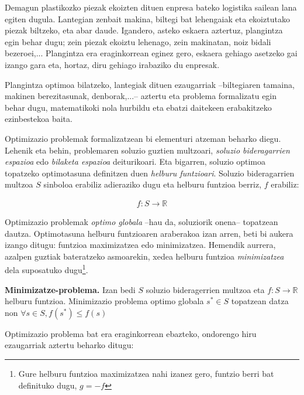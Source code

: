 \documentclass[eu]{ifirak}\usepackage[]{graphicx}\usepackage[]{color}
\begin{document}
\begin{tcolorbox}
\begin{ifexample}
Demagun plastikozko piezak ekoizten dituen enpresa bateko logistika sailean lana egiten dugula. Lantegian zenbait makina, biltegi bat lehengaiak eta ekoiztutako piezak biltzeko, eta abar daude. Igandero, asteko eskaera aztertuz, plangintza egin behar dugu; zein piezak ekoiztu lehenago, zein makinatan, noiz bidali bezeroei,... Plangintza era eraginkorrean eginez gero, eskaera gehiago asetzeko gai izango gara eta, hortaz, diru gehiago irabaziko du enpresak.

Plangintza optimoa bilatzeko, lantegiak dituen ezaugarriak --biltegiaren tamaina, makinen berezitasunak, denborak,...-- aztertu eta problema formalizatu egin behar dugu, matematikoki nola hurbildu eta ebatzi daitekeen erabakitzeko ezinbestekoa baita.

\end{ifexample}
\end{tcolorbox}

Optimizazio problemak formalizatzean bi elementuri atzeman beharko diegu. Lehenik eta behin, problemaren soluzio guztien multzoari, \textit{soluzio bideragarrien espazioa} edo \textit{bilaketa espazioa} deiturikoari. Eta bigarren, soluzio optimoa topatzeko optimotasuna definitzen duen \textit{helburu funtzioari}. Soluzio bideragarrien multzoa $S$ sinboloa erabiliz adieraziko dugu eta helburu funtzioa berriz, $f$ erabiliz:

\begin{align*}
f: S \rightarrow \mathbb{R}
\end{align*}

Optimizazio problemak \textit{optimo globala} --hau da, soluziorik onena-- topatzean dautza. Optimotasuna helburu funtzioaren araberakoa izan arren, beti bi aukera izango ditugu: funtzioa maximizatzea edo minimizatzea. Hemendik aurrera, azalpen guztiak bateratzeko asmoarekin, xedea helburu funtzioa \textit{minimizatzea} dela suposatuko dugu\footnote{Gure helburu funtzioa maximizatzea nahi izanez gero, funtzio berri bat definituko dugu, $g=-f$}.

\begin{ifdefinition}
{\bf Minimizatze-problema.} Izan bedi $S$ soluzio bideragerrien multzoa eta $f: S \rightarrow \mathbb{R}$ helburu funtzioa. Minimizazio problema optimo globala $s^*\in S$ topatzean datza non $\forall s\in S, f(s^*)\leq f(s)$
\end{ifdefinition}

Optimizazio problema bat era eraginkorrean ebazteko, ondorengo hiru ezaugarriak aztertu beharko ditugu:
\end{document}
